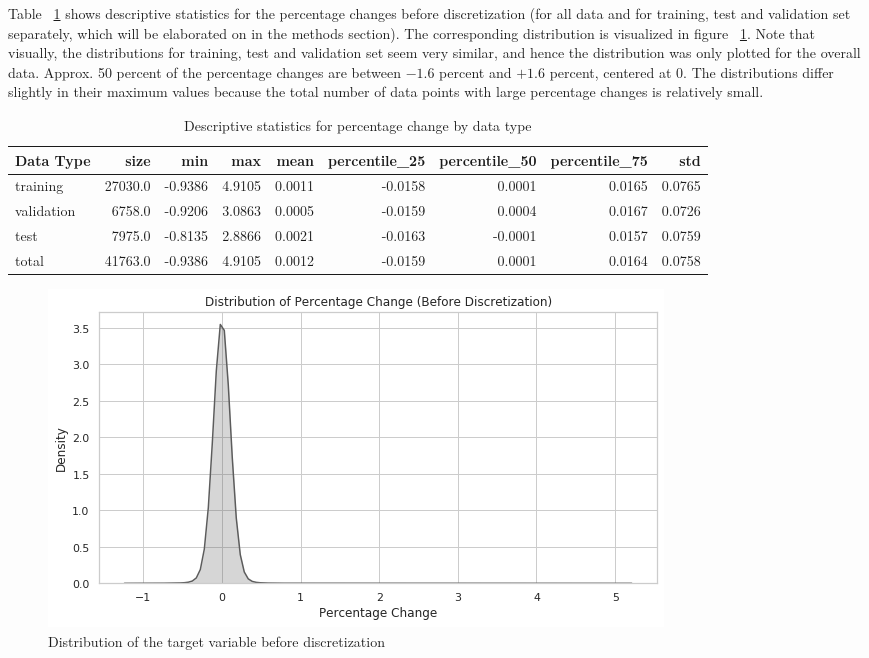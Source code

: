 \documentclass{article}
\begin{document}
	Table ~\ref{table:stats_by_data} shows descriptive statistics for the percentage changes before discretization (for all data and for training, test and validation set separately, which will be elaborated on in the methods section). The corresponding distribution is visualized in figure ~\ref{fig:dist_target_nondisc}. Note that visually, the distributions for training, test and validation set seem very similar, and hence the distribution was only plotted for the overall data. Approx. 50 percent of the percentage changes are between $-1.6$ percent and $+1.6$ percent, centered at $0$. The distributions differ slightly in their maximum values because the total number of data points with large percentage changes is relatively small.

	
	\begin{table}[h!]
		\centering
		\caption{Descriptive statistics for percentage change by data type}
		\label{table:stats_by_data}
		
		\begin{tabular}{lrrrrrrrr}
			\toprule
			Data Type &     size &     min &     max &    mean &  percentile\_25 &  percentile\_50 &  percentile\_75 &     std \\
			\midrule
			training   &  27030.0 & -0.9386 &  4.9105 &  0.0011 &        -0.0158 &         0.0001 &         0.0165 &  0.0765 \\
			validation &   6758.0 & -0.9206 &  3.0863 &  0.0005 &        -0.0159 &         0.0004 &         0.0167 &  0.0726 \\
			test       &   7975.0 & -0.8135 &  2.8866 &  0.0021 &        -0.0163 &        -0.0001 &         0.0157 &  0.0759 \\
			total      &  41763.0 & -0.9386 &  4.9105 &  0.0012 &        -0.0159 &         0.0001 &         0.0164 &  0.0758 \\
			\bottomrule
		\end{tabular}
		
	\end{table}%
	
	
	\begin{figure}[h!]
		\includegraphics[width=\linewidth]{img/dist_target_nondisc.png}
		\caption{Distribution of the target variable before discretization}
		\label{fig:dist_target_nondisc}
	\end{figure}
\end{document}
